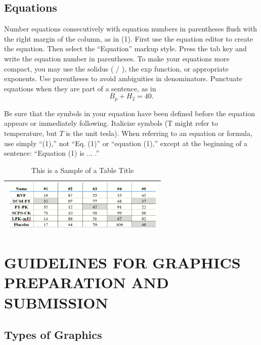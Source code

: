 \documentclass[correspondence]{IEEEtaes}
\begin{document}
\subsection{Equations}

Number equations consecutively with equation numbers in parentheses flush with the right margin of the column, as in (1). First use the equation editor to create the equation. Then select the ``Equation'' markup style. Press the tab key and write the equation number in parentheses. To make your equations more compact, you may use the solidus ( / ), the exp function, or appropriate exponents. Use parentheses to avoid ambiguities in denominators. Punctuate equations when they are part of a sentence, as in
\begin{equation}
B_p+H_2=40.
\end{equation}

Be sure that the symbols in your equation have been defined before the equation appears or immediately following. Italicize symbols (T might refer to temperature, but $T$ is the unit tesla). When referring to an equation or formula, use simply ``(1),'' not ``Eq. (1)'' or ``equation (1),'' except at the beginning of a sentence: ``Equation (1) is ... .''

\begin{table}
\caption{This is a Sample of a Table Title}
\label{table}
\tablefont
\begin{tabular*}{20pc}{@{}c@{}}
\hline
\centerline{\includegraphics[width=18.5pc]{figtbl1.png}}\\
\hline
\end{tabular*}
\label{tab1}
\end{table}


\section{GUIDELINES FOR GRAPHICS PREPARATION AND SUBMISSION}

\subsection{Types of Graphics}
\end{document}
